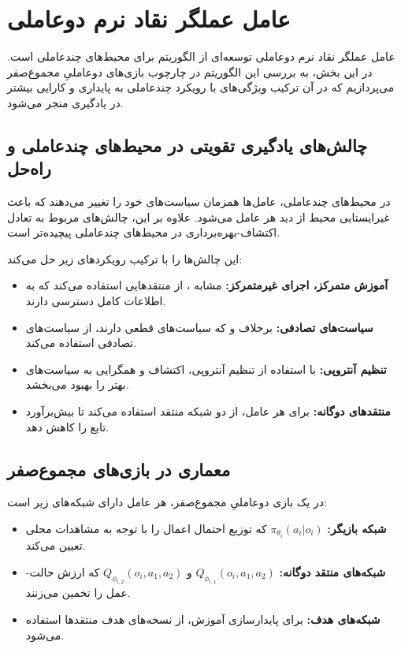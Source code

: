 \section{عامل عملگر نقاد نرم دو­عاملی}\label{sec:MASAC}

عامل عملگر نقاد نرم دو­عاملی
توسعه‌ای از الگوریتم  برای محیط‌های چند­عاملی است. در این بخش، به بررسی این الگوریتم در چارچوب بازی‌های دو­عاملیِ مجموع­‌صفر می‌پردازیم که در آن ترکیب ویژگی‌های  با رویکرد چند­عاملی به پایداری و کارایی بیشتر در یادگیری منجر می‌شود.

\subsection{چالش‌های یادگیری تقویتی در محیط‌های چند­عاملی و راه‌حل }

در محیط‌های چند­عاملی، عامل‌ها همزمان سیاست‌های خود را تغییر می‌دهند که باعث غیرایستایی محیط از دید هر عامل می‌شود. علاوه بر این، چالش‌های مربوط به تعادل اکتشاف-بهره‌برداری در محیط‌های چند­عاملی پیچیده‌تر است.

 این چالش‌ها را با ترکیب رویکردهای زیر حل می‌کند:
\begin{itemize}
    \item \textbf{آموزش متمرکز، اجرای غیرمتمرکز:} مشابه ، از منتقدهایی استفاده می‌کند که به اطلاعات کامل دسترسی دارند.
    \item \textbf{سیاست‌های تصادفی:} برخلاف  و  که سیاست‌های قطعی دارند،  از سیاست‌های تصادفی استفاده می‌کند.
    \item \textbf{تنظیم آنتروپی:} با استفاده از تنظیم آنتروپی، اکتشاف و همگرایی به سیاست‌های بهتر را بهبود می‌بخشد.
    \item \textbf{منتقدهای دوگانه:} برای هر عامل، از دو شبکه منتقد استفاده می‌کند تا بیش‌برآورد تابع  را کاهش دهد.
\end{itemize}

\subsection{معماری  در بازی‌های مجموع­‌صفر}

در یک بازی دو­عاملیِ مجموع­‌صفر، هر عامل دارای شبکه‌های زیر است:

\begin{itemize}
    \item \textbf{شبکه بازیگر:} $\pi_{\theta_i}(a_i|o_i)$ که توزیع احتمال اعمال را با توجه به مشاهدات محلی تعیین می‌کند.
    \item \textbf{شبکه‌های منتقد دوگانه:} $Q_{\phi_{i,1}}(o_i, a_1, a_2)$ و $Q_{\phi_{i,2}}(o_i, a_1, a_2)$ که ارزش حالت-عمل را تخمین می‌زنند.
    \item \textbf{شبکه‌های هدف:} برای پایدارسازی آموزش، از نسخه‌های هدف منتقدها استفاده می‌شود.
\end{itemize}

